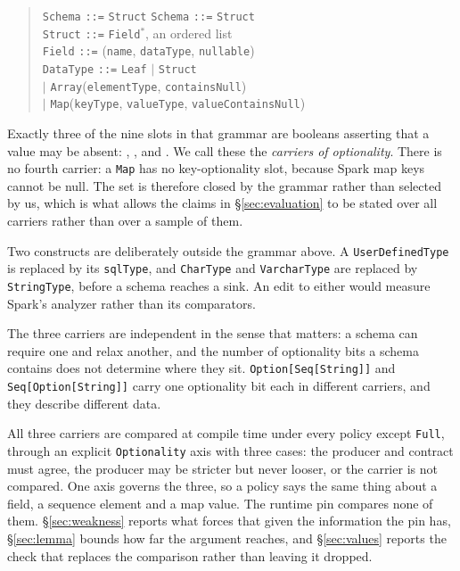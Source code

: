 \begin{quote}
\begin{tabbing}
\texttt{Schema} \= \texttt{::=} \= \texttt{Struct} \kill
\texttt{Schema} \> \texttt{::=} \> \texttt{Struct} \\
\texttt{Struct} \> \texttt{::=} \> \texttt{Field}$^{*}$, an ordered list \\
\texttt{Field} \> \texttt{::=} \> (\texttt{name}, \texttt{dataType}, \texttt{nullable}) \\
\texttt{DataType} \> \texttt{::=} \> \texttt{Leaf} $\mid$ \texttt{Struct} \\
 \> $\mid$ \> \texttt{Array}(\texttt{elementType}, \texttt{containsNull}) \\
 \> $\mid$ \> \texttt{Map}(\texttt{keyType}, \texttt{valueType}, \texttt{valueContainsNull})
\end{tabbing}
\end{quote}

Exactly three of the nine slots in that grammar are booleans asserting that a value may be absent: , , and . We call these the \emph{carriers of optionality}. There is no fourth carrier: a \texttt{Map} has no key-optionality slot, because Spark map keys cannot be null. The set is therefore closed by the grammar rather than selected by us, which is what allows the claims in \S\ref{sec:evaluation} to be stated over all carriers rather than over a sample of them.

Two constructs are deliberately outside the grammar above. A \texttt{UserDefinedType} is replaced by its \texttt{sqlType}, and \texttt{CharType} and \texttt{VarcharType} are replaced by \texttt{StringType}, before a schema reaches a sink. An edit to either would measure Spark's analyzer rather than its comparators.

The three carriers are independent in the sense that matters: a schema can require one and relax another, and the number of optionality bits a schema contains does not determine where they sit. \texttt{Option[Seq[String]]} and \texttt{Seq[Option[String]]} carry one optionality bit each in different carriers, and they describe different data.

All three carriers are compared at compile time under every policy except \texttt{Full}, through an explicit \texttt{Optionality} axis with three cases: the producer and contract must agree, the producer may be stricter but never looser, or the carrier is not compared. One axis governs the three, so a policy says the same thing about a field, a sequence element and a map value. The runtime pin compares none of them. \S\ref{sec:weakness} reports what forces that given the information the pin has, \S\ref{sec:lemma} bounds how far the argument reaches, and \S\ref{sec:values} reports the check that replaces the comparison rather than leaving it dropped.

